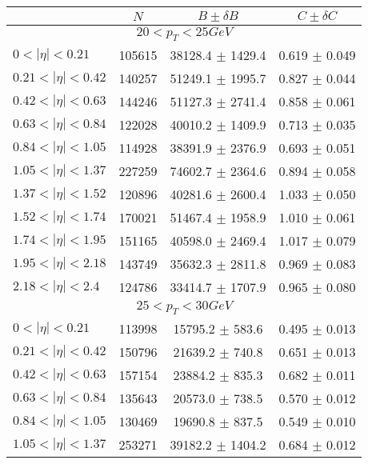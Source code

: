 \begin{tabular}{lccc}
\hline
    &   $N$   & $B \pm \delta B$  &  $C \pm \delta C$ \\
\hline
\hline
\multicolumn{4}{c}{$20 < p_{T} < 25 GeV$} \\
\hline
$0 < |\eta| <0.21$             & 105615     & 38128.4    $\pm$ 1429.4 & 0.619      $\pm$ 0.049 \\
$0.21 < |\eta| <0.42$          & 140257     & 51249.1    $\pm$ 1995.7 & 0.827      $\pm$ 0.044 \\
$0.42 < |\eta| <0.63$          & 144246     & 51127.3    $\pm$ 2741.4 & 0.858      $\pm$ 0.061 \\
$0.63 < |\eta| <0.84$          & 122028     & 40010.2    $\pm$ 1409.9 & 0.713      $\pm$ 0.035 \\
$0.84 < |\eta| <1.05$          & 114928     & 38391.9    $\pm$ 2376.9 & 0.693      $\pm$ 0.051 \\
$1.05 < |\eta| <1.37$          & 227259     & 74602.7    $\pm$ 2364.6 & 0.894      $\pm$ 0.058 \\
$1.37 < |\eta| <1.52$          & 120896     & 40281.6    $\pm$ 2600.4 & 1.033      $\pm$ 0.050 \\
$1.52 < |\eta| <1.74$          & 170021     & 51467.4    $\pm$ 1958.9 & 1.010      $\pm$ 0.061 \\
$1.74 < |\eta| <1.95$          & 151165     & 40598.0    $\pm$ 2469.4 & 1.017      $\pm$ 0.079 \\
$1.95 < |\eta| <2.18$          & 143749     & 35632.3    $\pm$ 2811.8 & 0.969      $\pm$ 0.083 \\
$2.18 < |\eta| <2.4$           & 124786     & 33414.7    $\pm$ 1707.9 & 0.965      $\pm$ 0.080 \\
\hline
\multicolumn{4}{c}{$25 < p_{T} < 30 GeV$} \\
\hline
$0 < |\eta| <0.21$             & 113998     & 15795.2    $\pm$ 583.6 & 0.495      $\pm$ 0.013 \\
$0.21 < |\eta| <0.42$          & 150796     & 21639.2    $\pm$ 740.8 & 0.651      $\pm$ 0.013 \\
$0.42 < |\eta| <0.63$          & 157154     & 23884.2    $\pm$ 835.3 & 0.682      $\pm$ 0.011 \\
$0.63 < |\eta| <0.84$          & 135643     & 20573.0    $\pm$ 738.5 & 0.570      $\pm$ 0.012 \\
$0.84 < |\eta| <1.05$          & 130469     & 19690.8    $\pm$ 837.5 & 0.549      $\pm$ 0.010 \\
$1.05 < |\eta| <1.37$          & 253271     & 39182.2    $\pm$ 1404.2 & 0.684      $\pm$ 0.012 \\

\end{tabular}

